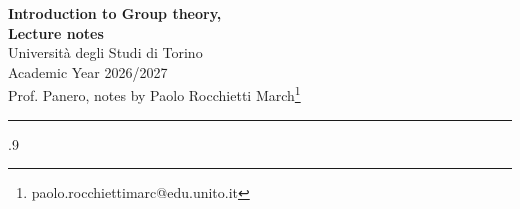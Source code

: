\documentclass[a4paper,11pt]{article}
\begin{document}
\begin{center}
\Large{\textbf{Introduction to Group theory,\\Lecture notes}}
\vspace{0.4cm}
\normalsize
\\ Università degli Studi di Torino\\Academic Year 2026/2027 \\Prof. Panero,
notes by Paolo Rocchietti March\footnote{paolo.rocchiettimarc@edu.unito.it} \\

\vspace{0.1cm}
\medskip
\normalsize
\end{center}
\vspace{0.4cm}
{\color{gray}\hrule}
\null\vfill
\vfill\null
\newpage
\begin{spacing}{.9}
\tableofcontents
\end{spacing}
\newpage
\pagestyle{fancy}
\thispagestyle{fancy}
\fancyfoot[C]{\small{\thepage}}















\end{document}
